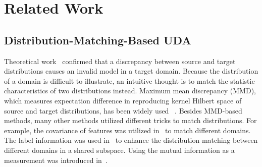 \documentclass[journal,twocolumn]{IEEEtran}
\theoremstyle{definition}
\begin{document}
\section{Related Work}
\label{relatedworkd}

\subsection{Distribution-Matching-Based UDA}
Theoretical work~\cite{ben2010theory} confirmed that a discrepancy between source and target distributions causes an invalid model in a target domain. Because the distribution of a domain is difficult to illustrate, an intuitive thought is to match the statistic characteristics of two distributions instead. Maximum mean discrepancy (MMD), which measures expectation difference in reproducing kernel Hilbert space of source and target distributions, has been widely used 
~\cite{pmlr-v37-long15,zellinger2017central,pmlr-v119-liu20m,long2017deep,pan2010domain,long2016unsupervised,7999259}.
Besides MMD-based methods, many other methods utilized different tricks to match distributions. For example,  the covariance of features was utilized in~\cite{sun2016deep} to match different domains. The label information was used in~\cite{9126270} to enhance the distribution matching between different domains in a shared subspace. Using the mutual information as a measurement was introduced in~\cite{pmlr-v119-liang20a}.
\end{document}
